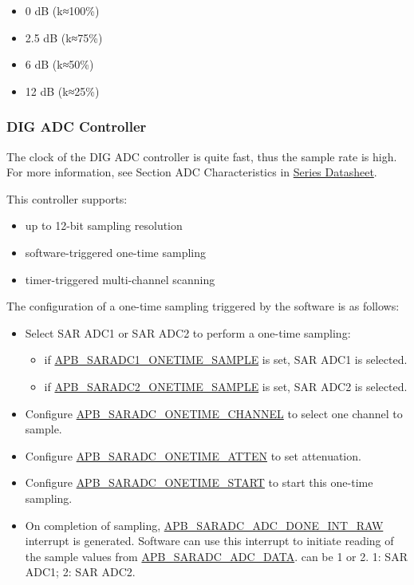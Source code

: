 \documentclass[main\_\_EN.tex]{subfiles}
\begin{document}
\begin{itemize}
    \item 0 dB (k≈100\%)
    \item 2.5 dB (k≈75\%)
    \item 6 dB (k≈50\%)
    \item 12 dB (k≈25\%)
\end{itemize}

\subsubsection{DIG ADC Controller}

The clock of the DIG ADC controller is quite fast, thus the sample rate is high. For more information, see Section ADC Characteristics in \href{https://www.espressif.com/sites/default/files/documentation/esp32-c3_datasheet_en.pdf}{\chipname{} Series Datasheet}. 

This controller supports: 

\begin{itemize}
    \item up to 12-bit sampling resolution
    \item software-triggered one-time sampling
    \item timer-triggered multi-channel scanning
\end{itemize}

The configuration of a one-time sampling triggered by the software is as follows:
\begin{itemize}
    \item Select SAR ADC1 or SAR ADC2 to perform a one-time sampling:
    \begin{itemize}
        \item if \hyperref[fielddesc:APBSARADCSARADC1ONETIMESAMPLE]{APB\_SARADC1\_ONETIME\_SAMPLE} is set, SAR ADC1 is selected.
        \item if \hyperref[fielddesc:APBSARADCSARADC1ONETIMESAMPLE]{APB\_SARADC2\_ONETIME\_SAMPLE} is set, SAR ADC2 is selected.
    \end{itemize}
    \item Configure \hyperref[fielddesc:APBSARADCSARADCONETIMECHANNEL]{APB\_SARADC\_ONETIME\_CHANNEL} to select one channel to sample.
    \item Configure \hyperref[fielddesc:APBSARADCSARADCONETIMEATTEN]{APB\_SARADC\_ONETIME\_ATTEN} to set attenuation.
    \item Configure \hyperref[fielddesc:APBSARADCSARADCONETIMESTART]{APB\_SARADC\_ONETIME\_START} to start this one-time sampling.
    \item On completion of sampling, \hyperref[fielddesc:APBSARADCAPBSARADC2DONEINTRAW]{APB\_SARADC\_ADC\_DONE\_INT\_RAW} interrupt is generated. Software can use this interrupt to initiate reading of the sample values from \hyperref[fielddesc:APBSARADCAPBSARADC1DATA]{APB\_SARADC\_ADC\_DATA}.  can be 1 or 2. 1: SAR ADC1; 2: SAR ADC2.
\end{itemize}
\end{document}
